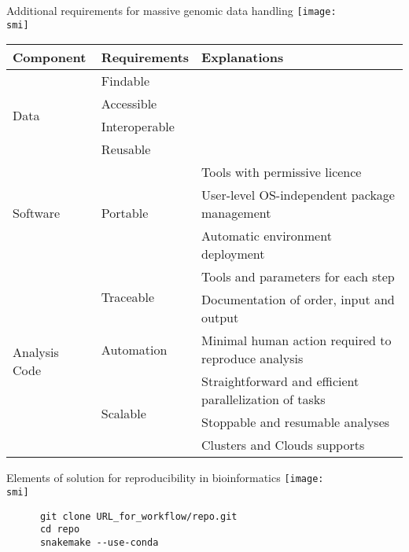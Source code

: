 \documentclass[10pt]{beamer}
\def\smi{out/ln/updir/mw-gcthesis-oral/library.bib}
\begin{document}
    \begin{frame}{Additional requirements for massive genomic data handling}
      \def\smi{out/ln/updir/mw-gcthesis-oral/ink/reproducibility/arrow_reproducibility.pdf}
      \texttt{[image: \\smi]}

      {\scriptsize
      \begin{tabular}{@{}lll@{}}
        \toprule
        Component                      & Requirements                & Explanations            \\ \midrule
        \multirow{4}{*}{Data}          & Findable &                                \\
        & Accessible                        &       \\
        & Interoperable                    &        \\ 
        & Reusable                          &       \\ \midrule
        \multirow{3}{*}{Software}             & \multirow{3}{*}{Portable} & Tools with permissive licence \\
        & & User-level OS-independent package management            \\
        & & Automatic environment deployment           \\ \midrule
        \multirow{6}{*}{Analysis Code} & \multirow{2}{*}{Traceable} & Tools and parameters for each step       \\
        & & Documentation of order, input and output \\
        & Automation & Minimal human action required to reproduce analysis \\ 
        & \multirow{3}{*}{Scalable} & Straightforward and efficient parallelization of tasks \\
        & & Stoppable and resumable analyses \\
        & & Clusters and Clouds supports \\ \bottomrule
      \end{tabular}
      }
    \end{frame}
    \begin{frame}[fragile]{Elements of solution for reproducibility in bioinformatics}
      \def\smi{out/ln/updir/mw-gcthesis-oral/ink/reproducibility/arrow_reproducibility_solutions.pdf}
      \texttt{[image: \\smi]}
      \begin{lstlisting}
      git clone URL_for_workflow/repo.git
      cd repo
      snakemake --use-conda
      \end{lstlisting}
    \end{frame}
\end{document}
